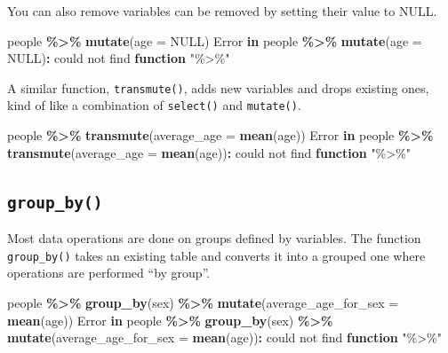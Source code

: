 \documentclass[
]{book}
\newenvironment{Shaded}{\begin{snugshade}}{\end{snugshade}}
\newcommand{\AttributeTok}[1]{\textcolor[rgb]{0.13,0.29,0.53}{#1}}
\newcommand{\ConstantTok}[1]{\textcolor[rgb]{0.56,0.35,0.01}{#1}}
\newcommand{\ControlFlowTok}[1]{\textcolor[rgb]{0.13,0.29,0.53}{\textbf{#1}}}
\newcommand{\FunctionTok}[1]{\textcolor[rgb]{0.13,0.29,0.53}{\textbf{#1}}}
\newcommand{\NormalTok}[1]{#1}
\newcommand{\SpecialCharTok}[1]{\textcolor[rgb]{0.81,0.36,0.00}{\textbf{#1}}}
\newcommand{\StringTok}[1]{\textcolor[rgb]{0.31,0.60,0.02}{#1}}
\begin{document}
You can also remove variables can be removed by setting their value to NULL.

\begin{Shaded}
\begin{Highlighting}[]
\NormalTok{people }\SpecialCharTok{\%\textgreater{}\%} \FunctionTok{mutate}\NormalTok{(}\AttributeTok{age =} \ConstantTok{NULL}\NormalTok{)}
\NormalTok{Error }\ControlFlowTok{in}\NormalTok{ people }\SpecialCharTok{\%\textgreater{}\%} \FunctionTok{mutate}\NormalTok{(}\AttributeTok{age =} \ConstantTok{NULL}\NormalTok{)}\SpecialCharTok{:}\NormalTok{ could not find }\ControlFlowTok{function} \StringTok{"\%\textgreater{}\%"}
\end{Highlighting}
\end{Shaded}

A similar function, \texttt{transmute()}, adds new variables and drops existing ones, kind of like a combination of \texttt{select()} and \texttt{mutate()}.

\begin{Shaded}
\begin{Highlighting}[]
\NormalTok{people }\SpecialCharTok{\%\textgreater{}\%} \FunctionTok{transmute}\NormalTok{(}\AttributeTok{average\_age =} \FunctionTok{mean}\NormalTok{(age))}
\NormalTok{Error }\ControlFlowTok{in}\NormalTok{ people }\SpecialCharTok{\%\textgreater{}\%} \FunctionTok{transmute}\NormalTok{(}\AttributeTok{average\_age =} \FunctionTok{mean}\NormalTok{(age))}\SpecialCharTok{:}\NormalTok{ could not find }\ControlFlowTok{function} \StringTok{"\%\textgreater{}\%"}
\end{Highlighting}
\end{Shaded}

\subsection*{\texorpdfstring{\texttt{group\_by()}}{group\_by()}}\label{group_by}

Most data operations are done on groups defined by variables. The function \texttt{group\_by()} takes an existing table and converts it into a grouped one where operations are performed ``by group''.

\begin{Shaded}
\begin{Highlighting}[]
\NormalTok{people }\SpecialCharTok{\%\textgreater{}\%} 
  \FunctionTok{group\_by}\NormalTok{(sex) }\SpecialCharTok{\%\textgreater{}\%}
  \FunctionTok{mutate}\NormalTok{(}\AttributeTok{average\_age\_for\_sex =} \FunctionTok{mean}\NormalTok{(age)) }
\NormalTok{Error }\ControlFlowTok{in}\NormalTok{ people }\SpecialCharTok{\%\textgreater{}\%} \FunctionTok{group\_by}\NormalTok{(sex) }\SpecialCharTok{\%\textgreater{}\%} \FunctionTok{mutate}\NormalTok{(}\AttributeTok{average\_age\_for\_sex =} \FunctionTok{mean}\NormalTok{(age))}\SpecialCharTok{:}\NormalTok{ could not find }\ControlFlowTok{function} \StringTok{"\%\textgreater{}\%"}
\end{Highlighting}
\end{Shaded}
\end{document}
